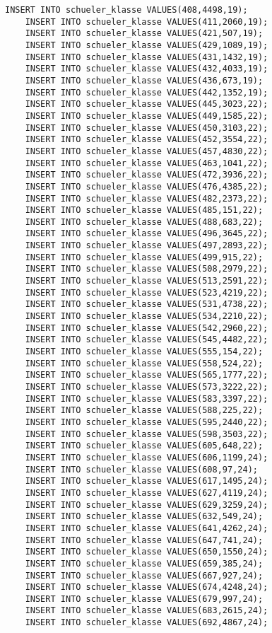 \begin{lstlisting}[breaklines=True, numbers=none, basicstyle=\tiny, keepspaces=false]
	INSERT INTO schueler_klasse VALUES(408,4498,19);
	INSERT INTO schueler_klasse VALUES(411,2060,19);
	INSERT INTO schueler_klasse VALUES(421,507,19);
	INSERT INTO schueler_klasse VALUES(429,1089,19);
	INSERT INTO schueler_klasse VALUES(431,1432,19);
	INSERT INTO schueler_klasse VALUES(432,4033,19);
	INSERT INTO schueler_klasse VALUES(436,673,19);
	INSERT INTO schueler_klasse VALUES(442,1352,19);
	INSERT INTO schueler_klasse VALUES(445,3023,22);
	INSERT INTO schueler_klasse VALUES(449,1585,22);
	INSERT INTO schueler_klasse VALUES(450,3103,22);
	INSERT INTO schueler_klasse VALUES(452,3554,22);
	INSERT INTO schueler_klasse VALUES(457,4830,22);
	INSERT INTO schueler_klasse VALUES(463,1041,22);
	INSERT INTO schueler_klasse VALUES(472,3936,22);
	INSERT INTO schueler_klasse VALUES(476,4385,22);
	INSERT INTO schueler_klasse VALUES(482,2373,22);
	INSERT INTO schueler_klasse VALUES(485,151,22);
	INSERT INTO schueler_klasse VALUES(488,683,22);
	INSERT INTO schueler_klasse VALUES(496,3645,22);
	INSERT INTO schueler_klasse VALUES(497,2893,22);
	INSERT INTO schueler_klasse VALUES(499,915,22);
	INSERT INTO schueler_klasse VALUES(508,2979,22);
	INSERT INTO schueler_klasse VALUES(513,2591,22);
	INSERT INTO schueler_klasse VALUES(523,4219,22);
	INSERT INTO schueler_klasse VALUES(531,4738,22);
	INSERT INTO schueler_klasse VALUES(534,2210,22);
	INSERT INTO schueler_klasse VALUES(542,2960,22);
	INSERT INTO schueler_klasse VALUES(545,4482,22);
	INSERT INTO schueler_klasse VALUES(555,154,22);
	INSERT INTO schueler_klasse VALUES(558,524,22);
	INSERT INTO schueler_klasse VALUES(565,1777,22);
	INSERT INTO schueler_klasse VALUES(573,3222,22);
	INSERT INTO schueler_klasse VALUES(583,3397,22);
	INSERT INTO schueler_klasse VALUES(588,225,22);
	INSERT INTO schueler_klasse VALUES(595,2440,22);
	INSERT INTO schueler_klasse VALUES(598,3503,22);
	INSERT INTO schueler_klasse VALUES(605,648,22);
	INSERT INTO schueler_klasse VALUES(606,1199,24);
	INSERT INTO schueler_klasse VALUES(608,97,24);
	INSERT INTO schueler_klasse VALUES(617,1495,24);
	INSERT INTO schueler_klasse VALUES(627,4119,24);
	INSERT INTO schueler_klasse VALUES(629,3259,24);
	INSERT INTO schueler_klasse VALUES(632,549,24);
	INSERT INTO schueler_klasse VALUES(641,4262,24);
	INSERT INTO schueler_klasse VALUES(647,741,24);
	INSERT INTO schueler_klasse VALUES(650,1550,24);
	INSERT INTO schueler_klasse VALUES(659,385,24);
	INSERT INTO schueler_klasse VALUES(667,927,24);
	INSERT INTO schueler_klasse VALUES(674,4248,24);
	INSERT INTO schueler_klasse VALUES(679,997,24);
	INSERT INTO schueler_klasse VALUES(683,2615,24);
	INSERT INTO schueler_klasse VALUES(692,4867,24);

\end{lstlisting}
